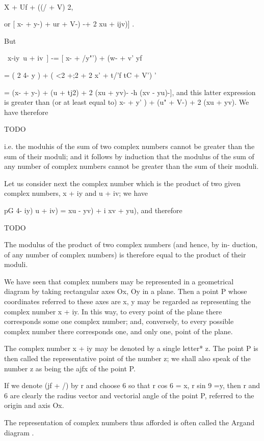 \ \ {X + Uf + ((/ + V) 2,

or [ x- + y-) + ur + V-) -+ 2 xu + ijv)] .

But

 \ x-\-iy\-\-\ u + iv\ ] -= [ x- + /y"') + (w- + v' yf

= ( 2 4- y ) + ( <2 +;2 + 2 x' + t/'f tC + V') '

= (x- + y-) + (u + tj2) + 2 (xu + yv)- -h (xv - yu)-], and this
latter expression is greater than (or at least equal to) x- + y' ) +
(u" + V-) + 2 (xu + yv). We have therefore

TODO

i.e. the moduhis of the sum of two complex numbers cannot be greater
than the sum of their moduli; and it follows by induction that the
modulus of the sum of any number of complex numbers cannot be greater
than the sum of their moduli.

%
%

Let us consider next the complex number which is the product of two
given complex numbers, x + iy and u + iv; we have

 pG 4- iy) u + iv) = xu - yv) + i xv + yu), and therefore

TODO

The modulus of the product of two complex numbers (and hence, by in-
duction, of any number of complex numbers) is therefore equal to the
product of their moduli.


We have seen that complex numbers may be represented in a geometrical
diagram by taking rectangular axes Ox, Oy in a plane. Then a point P
whose coordinates referred to these axes are x, y may be regarded as
representing the complex number x + iy. In this way, to every point of
the plane there corresponds some one complex number; and, conversely,
to every possible complex number there corresponds one, and only one,
point of the plane.

The complex number x + iy may be denoted by a single letter* z. The
point P is then called the representative point of the number z; we
shall also speak of the number z as being the ajfx of the point P.

If we denote (jf + /) by r and choose 6 so that r cos 6 = x, r sin 9
=y, then r and 6 are clearly the radius vector and vectorial angle of
the point P, referred to the origin and axis Ox.

The representation of complex numbers thus afforded is often called
the Argand diagram .

}
